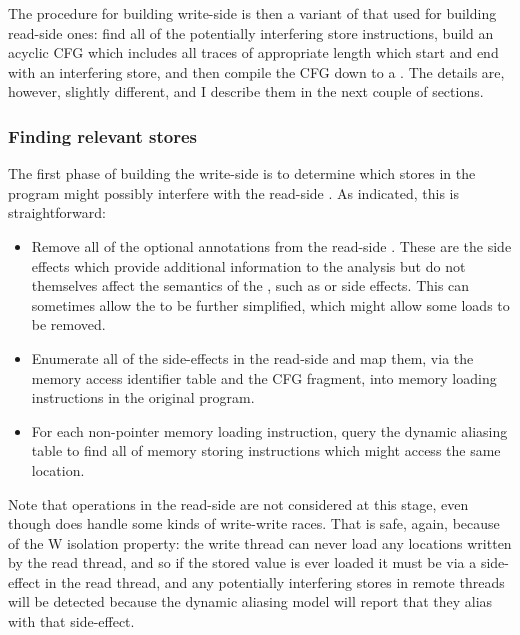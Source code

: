 The procedure for building write-side {\StateMachines} is then a
variant of that used for building read-side ones: find all of the
potentially interfering store instructions, build an acyclic CFG which
includes all traces of appropriate length which start and end with an
interfering store, and then compile the CFG down to a {\StateMachine}.
The details are, however, slightly different, and I describe them in
the next couple of sections.

\subsubsection{Finding relevant stores}

The first phase of building the write-side \StateMachines is to
determine which stores in the program might possibly interfere with
the read-side {\StateMachine}.  As indicated, this is straightforward:

\begin{itemize}
\item
  Remove all of the optional annotations from the read-side
  \StateMachine.  These are the side effects which provide additional
  information to the analysis but do not themselves affect the
  semantics of the \StateMachine, such as  or
   side effects.  This can sometimes allow the
  {\StateMachine} to be further simplified, which might allow
  some loads to be removed.  
\item
  Enumerate all of the  side-effects in the read-side
  {\StateMachine} and map them, via the memory access identifier table
  and the CFG fragment, into memory loading instructions in the original program.
\item
  For each non-pointer memory loading instruction, query the dynamic
  aliasing table to find all of memory storing instructions which
  might access the same location.
\end{itemize}

Note that  operations in the read-side {\StateMachine}
are not considered at this stage, even though {\technique} does handle
some kinds of write-write races.  That is safe, again, because of the
W isolation property: the write thread can never load any locations
written by the read thread, and so if the stored value is ever loaded
it must be via a  side-effect in the read thread, and any
potentially interfering stores in remote threads will be detected
because the dynamic aliasing model will report that they alias with
that  side-effect.

